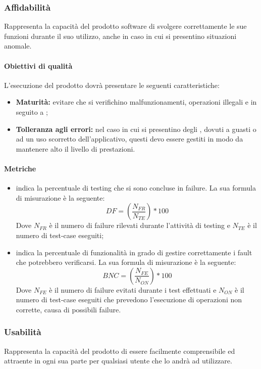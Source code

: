 \documentclass[NormeDiProgetto.tex]{subfiles}
\begin{document}
	\subsubsection{Affidabilità}
	Rappresenta la capacità del prodotto software di svolgere correttamente le sue funzioni durante il suo utilizzo, anche in caso in cui si presentino situazioni anomale.
	\paragraph{Obiettivi di qualità}
	L'esecuzione del prodotto dovrà presentare le seguenti caratteristiche:
	\begin{itemize}
		\item \textbf{Maturità:} evitare che si verifichino malfunzionamenti, operazioni illegali e  in seguito a ;
		\item \textbf{Tolleranza agli errori:} nel caso in cui si presentino degli , dovuti a guasti o ad un uso scorretto dell'applicativo, questi devo essere gestiti in modo da mantenere alto il livello di prestazioni.
	\end{itemize}
	\paragraph{Metriche}
	\begin{itemize}
		\item {} indica la percentuale di testing che si sono concluse in failure. La sua formula di misurazione è la seguente: \[DF=(\frac{N_{FR}}{N_{TE}})*100\] Dove $ N_{FR} $ è il numero di failure rilevati durante l'attività di testing e $ N_{TE} $ è il numero di test-case eseguiti;
		\item {} indica la percentuale di funzionalità in grado di gestire correttamente i fault che potrebbero verificarsi. La sua formula di misurazione è la seguente: \[BNC=(\frac{N_{FE}}{N_{ON}})*100\] Dove $ N_{FE} $ è il numero di failure evitati durante i test effettuati e $ N_{ON} $ è il numero di test-case eseguiti che prevedono l'esecuzione di operazioni non corrette, causa di possibili failure.
	\end{itemize}
	\subsubsection{Usabilità}
	Rappresenta la capacità del prodotto di essere facilmente comprensibile ed attraente in ogni sua parte per qualsiasi utente che lo andrà ad utilizzare.
\end{document}
